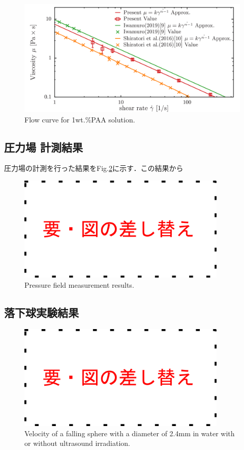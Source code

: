 \begin{figure}[ht]
    \centering
    \includegraphics[width=12cm,clip]{4-Results/PAA-viscosity.png}
    \caption{Flow curve for 1wt.\%PAA solution.}
    \label{fig:PAA-vis}
\end{figure}

\newpage

\subsection{圧力場 計測結果}

圧力場の計測を行った結果をFig.\ref{fig:pressure}に示す．この結果から

\begin{figure}
    \centering
    \includegraphics[width=10cm,clip]{tmp.png}
    \caption{Pressure field measurement results.}
    \label{fig:pressure}
\end{figure}

\subsection{落下球実験結果}

\begin{figure}[h]
    \centering
    \includegraphics[width=10cm,clip]{tmp.png}
    \caption{Velocity of a falling sphere with a diameter of 2.4mm in water with or without ultrasound irradiation.}
    \label{fig:water}
\end{figure}

